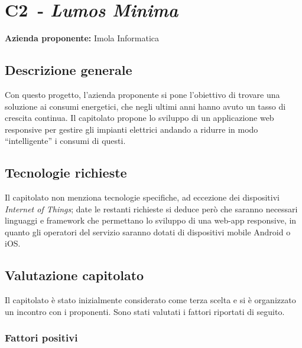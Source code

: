 
\renewcommand{\capName}{\textit{Lumos Minima}} %
\renewcommand{\capCode}{C2} %
\renewcommand{\capLink}{https://www.math.unipd.it/~tullio/IS-1/2022/Progetto/C2.pdf} %
\renewcommand{\capProposer}{ImolaInformatica} %


\section{\capCode\ - \capName}
\textbf{Azienda proponente:} Imola Informatica
\subsection{Descrizione generale}
Con questo progetto, l'azienda proponente si pone l'obiettivo di trovare una soluzione ai consumi energetici, che negli ultimi anni hanno avuto un tasso di crescita continua. Il capitolato propone lo sviluppo di un applicazione web responsive per gestire gli impianti elettrici andando a ridurre in modo “intelligente” i consumi di questi.
\subsection{Tecnologie richieste}
Il capitolato non menziona tecnologie specifiche, ad eccezione dei dispositivi \textit{Internet of Things}; date le restanti richieste si deduce però che saranno necessari linguaggi e framework che permettano lo sviluppo di una web-app responsive, in quanto gli operatori del servizio saranno dotati di dispositivi mobile Android o iOS.

\subsection{Valutazione capitolato}
Il capitolato è stato inizialmente considerato come terza scelta e si è organizzato un incontro con i proponenti. Sono stati valutati i fattori riportati di seguito.

\subsubsection{Fattori positivi}

